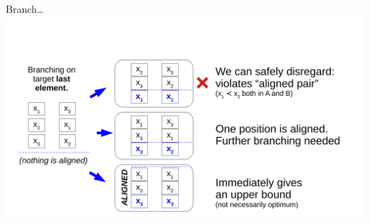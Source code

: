 \documentclass[10pt, xcolor=svgnames]{beamer}
\begin{document}
\begin{frame}[label={sec:orgb6cf8b1}]{Branch\ldots{}}
\includegraphics[width=\textwidth]{./img/BB.pdf}
\end{frame}
\end{document}
